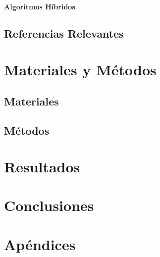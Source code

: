 \documentclass[12pt,titlepage,twoside,openright]{book}
\begin{document}
\subsubsection{Algoritmos Híbridos}

\section{Referencias Relevantes}

\chapter{Materiales y Métodos}
\label{cap:materialesymetodos}

\section{Materiales}

\section{Métodos}

\chapter{Resultados}
\label{cap:resultados}

\chapter{Conclusiones}
\label{cap:conclusiones}

\backmatter







\appendix
\chapter{Apéndices}
\label{ap:apendices}
\end{document}
